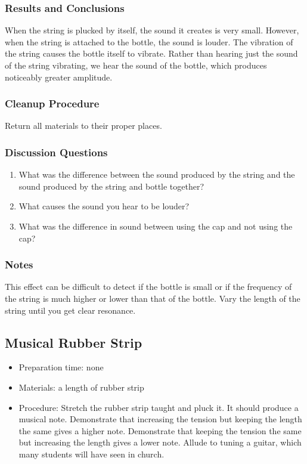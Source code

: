 \subsubsection*{Results and Conclusions}
When the string is plucked by itself, the sound it creates is very small.  However, when the string is attached to the bottle, the sound is louder.  The vibration of the string causes the bottle itself to vibrate.  Rather than hearing just the sound of the string vibrating, we hear the sound of the bottle, which produces noticeably greater amplitude.

\subsubsection*{Cleanup Procedure}
Return all materials to their proper places.

\subsubsection*{Discussion Questions}
\begin{enumerate}
\item{What was the difference between the sound produced by the string and the sound produced by the string and bottle together?}
\item{What causes the sound you hear to be louder?}
\item{What was the difference in sound between using the cap and not using the cap?}
\end{enumerate}

\subsubsection*{Notes}
This effect can be difficult to detect if the bottle is small or if the frequency of the string is much higher or lower than that of the bottle.  Vary the length of the string until you get clear resonance.


\subsection{Musical Rubber Strip}
\begin{itemize}
\item{Preparation time: none}
\item{Materials: a length of rubber strip}
\item{Procedure: Stretch the rubber strip taught and pluck it. It should produce a musical note. Demonstrate that increasing the tension but keeping the length the same gives a higher note. Demonstrate that keeping the tension the same but increasing the length gives a lower note. Allude to tuning a guitar, which many students will have seen in church.}
\end{itemize}

